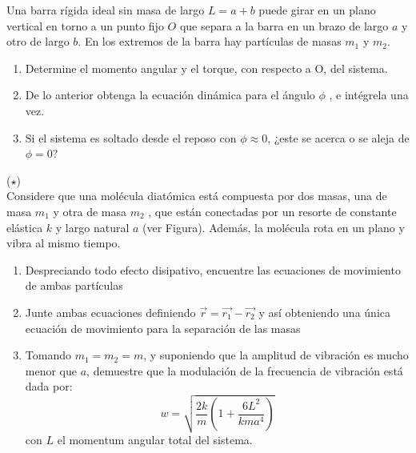 \documentclass[
	spanish, %
	letterpaper, oneside
]{article}
\begin{document}
Una barra rígida ideal sin masa de largo $L = a + b$ puede girar en un plano vertical en torno a un punto fijo $O$ que separa a la barra en un brazo de largo $a$ y otro de largo $b$. En los extremos de la barra hay partículas de masas $m_1$ y $m_2$.

\begin{enumerate}[label=\alph*)]
    \item Determine el momento angular y el torque, con respecto a O, del sistema.

    \item De lo anterior obtenga la ecuación dinámica para el ángulo $\phi$ , e intégrela una vez.
    
    \item Si el sistema es soltado desde el reposo con $\phi \approx 0$, ¿este se acerca o se aleja de $\phi = 0$?
\end{enumerate}


 ($\star$)\\

Considere que una molécula diatómica está compuesta por dos masas, una de masa $m_1$ y otra de masa $m_2$ , que están conectadas por un resorte de constante elástica $k$ y largo natural $a$ (ver Figura). Además, la molécula rota en un plano y vibra al mismo tiempo.

\begin{enumerate}[label=\alph*)]
    \item Despreciando todo efecto disipativo, encuentre las ecuaciones de movimiento de ambas partículas
    \item Junte ambas ecuaciones definiendo $\vec{r} = \vec{r_1} - \vec{r_2}$ y así obteniendo una única ecuación de movimiento para la separación de las masas
    \item Tomando $m_1 = m_2 = m$, y suponiendo que la amplitud de vibración es mucho menor que $a$, demuestre que la modulación de la frecuencia de vibración está dada por:
    $$ w = \sqrt{\frac{2k}{m} \left (  1 + \frac{6L^2}{kma^4}\right )} $$
    con $L$ el momentum angular total del sistema. 
\end{enumerate}
\end{document}
